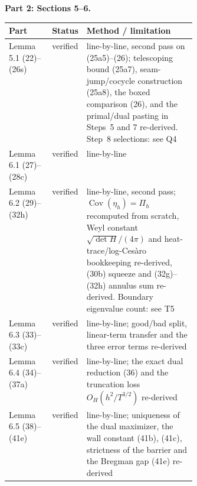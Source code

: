 \documentclass[11pt]{article}
\begin{document}
\medskip\noindent\begin{minipage}{\linewidth}\textbf{Part 2: Sections 5--6.}\par\nobreak\smallskip\nobreak
\noindent\begin{tabularx}{\linewidth}{@{}>{\raggedright\arraybackslash}p{0.235\linewidth}>{\raggedright\arraybackslash}p{0.135\linewidth}X@{}}
\toprule
Part & Status & Method / limitation \\
\midrule
Lemma 5.1 (22)--(26s) & verified & line-by-line, second pass on (25a5)--(26); telescoping bound (25a7), seam-jump/cocycle construction (25a8), the boxed comparison (26), and the primal/dual pasting in Steps~5 and 7 re-derived. Step~8 selections: see Q4 \\
Lemma 6.1 (27)--(28c) & verified & line-by-line \\
Lemma 6.2 (29)--(32h) & verified & line-by-line, second pass; $\operatorname{Cov}(\eta_h)=\Pi_h$ recomputed from scratch, Weyl constant $\sqrt{\det H}/(4\pi)$ and heat-trace/log-Ces\`aro bookkeeping re-derived, (30b) squeeze and (32g)--(32h) annulus sum re-derived. Boundary eigenvalue count: see T5 \\
Lemma 6.3 (33)--(33c) & verified & line-by-line; good/bad split, linear-term transfer and the three error terms re-derived \\
Lemma 6.4 (34)--(37a) & verified & line-by-line; the exact dual reduction (36) and the truncation loss $O_H(h^2/T^{3/2})$ re-derived \\
Lemma 6.5 (38)--(41e) & verified & line-by-line; uniqueness of the dual maximizer, the wall constant (41b), (41c), strictness of the barrier and the Bregman gap (41e) re-derived \\
\bottomrule
\end{tabularx}
\end{minipage}
\end{document}
